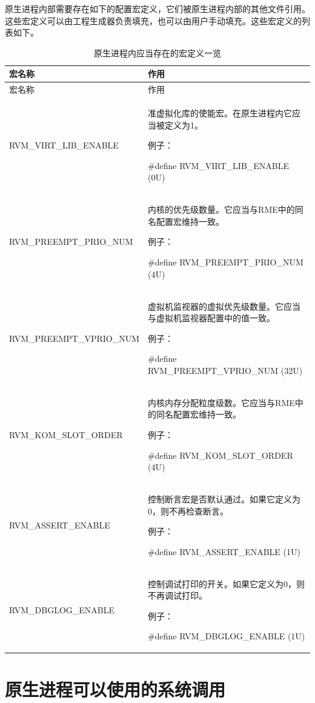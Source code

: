 原生进程内部需要存在如下的配置宏定义，它们被原生进程内部的其他文件引用。这些宏定义可以由工程生成器负责填充，也可以由用户手动填充。这些宏定义的列表如下。

\begin{xltabular}{\textwidth}{@{}>{\hsize\raggedright\arraybackslash}X>{\hsize\raggedright\arraybackslash}X@{}}
\caption{原生进程内应当存在的宏定义一览}\label{tab:3-4}\\
\toprule
宏名称 & 作用\tabularnewline
\endfirsthead
\toprule
宏名称 & 作用\tabularnewline
\midrule
\endhead
\bottomrule
\endlastfoot
RVM\_\allowbreak{}VIRT\_\allowbreak{}LIB\_\allowbreak{}ENABLE\strut
 & 准虚拟化库的使能宏。在原生进程内它应当被定义为1。

例子：

\#define RVM\_\allowbreak{}VIRT\_\allowbreak{}LIB\_\allowbreak{}ENABLE (0U)\strut
\tabularnewline
RVM\_\allowbreak{}PREEMPT\_\allowbreak{}PRIO\_\allowbreak{}NUM\strut
 & 内核的优先级数量。它应当与RME中的同名配置宏维持一致。

例子：

\#define RVM\_\allowbreak{}PREEMPT\_\allowbreak{}PRIO\_\allowbreak{}NUM (4U)\strut
\tabularnewline
RVM\_\allowbreak{}PREEMPT\_\allowbreak{}VPRIO\_\allowbreak{}NUM\strut
 & 虚拟机监视器的虚拟优先级数量。它应当与虚拟机监视器配置中的值一致。

例子：

\#define RVM\_\allowbreak{}PREEMPT\_\allowbreak{}VPRIO\_\allowbreak{}NUM (32U)\strut
\tabularnewline
RVM\_\allowbreak{}KOM\_\allowbreak{}SLOT\_\allowbreak{}ORDER\strut
 & 内核内存分配粒度级数。它应当与RME中的同名配置宏维持一致。

例子：

\#define RVM\_\allowbreak{}KOM\_\allowbreak{}SLOT\_\allowbreak{}ORDER (4U)\strut
\tabularnewline
RVM\_\allowbreak{}ASSERT\_\allowbreak{}ENABLE\strut
 & 控制断言宏是否默认通过。如果它定义为0，则不再检查断言。

例子：

\#define RVM\_\allowbreak{}ASSERT\_\allowbreak{}ENABLE (1U)\strut
\tabularnewline
RVM\_\allowbreak{}DBGLOG\_\allowbreak{}ENABLE\strut
 & 控制调试打印的开关。如果它定义为0，则不再调试打印。

例子：

\#define RVM\_\allowbreak{}DBGLOG\_\allowbreak{}ENABLE (1U)\strut
\tabularnewline
\end{xltabular}

\section{原生进程可以使用的系统调用}\label{sec:3-5}

